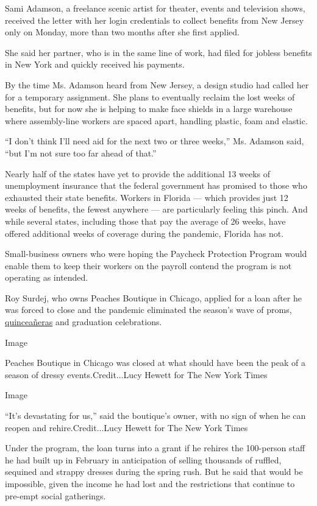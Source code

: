 Sami Adamson, a freelance scenic artist for theater, events and
television shows, received the letter with her login credentials to
collect benefits from New Jersey only on Monday, more than two months
after she first applied.

She said her partner, who is in the same line of work, had filed for
jobless benefits in New York and quickly received his payments.

By the time Ms. Adamson heard from New Jersey, a design studio had
called her for a temporary assignment. She plans to eventually reclaim
the lost weeks of benefits, but for now she is helping to make face
shields in a large warehouse where assembly-line workers are spaced
apart, handling plastic, foam and elastic.

``I don't think I'll need aid for the next two or three weeks,'' Ms.
Adamson said, ``but I'm not sure too far ahead of that.''

Nearly half of the states have yet to provide the additional 13 weeks of
unemployment insurance that the federal government has promised to those
who exhausted their state benefits. Workers in Florida --- which
provides just 12 weeks of benefits, the fewest anywhere --- are
particularly feeling this pinch. And while several states, including
those that pay the average of 26 weeks, have offered additional weeks of
coverage during the pandemic, Florida has not.

Small-business owners who were hoping the Paycheck Protection Program
would enable them to keep their workers on the payroll contend the
program is not operating as intended.

Roy Surdej, who owns Peaches Boutique in Chicago, applied for a loan
after he was forced to close and the pandemic eliminated the season's
wave of proms,
\href{https://www.nytimes3xbfgragh.onion/2019/11/12/style/quinceaera-genz-millennial.html}{quinceañeras}
and graduation celebrations.

Image

Peaches Boutique in Chicago was closed at what should have been the peak
of a season of dressy events.Credit...Lucy Hewett for The New York Times

Image

``It's devastating for us,'' said the boutique's owner, with no sign of
when he can reopen and rehire.Credit...Lucy Hewett for The New York
Times

Under the program, the loan turns into a grant if he rehires the
100-person staff he had built up in February in anticipation of selling
thousands of ruffled, sequined and strappy dresses during the spring
rush. But he said that would be impossible, given the income he had lost
and the restrictions that continue to pre-empt social gatherings.

